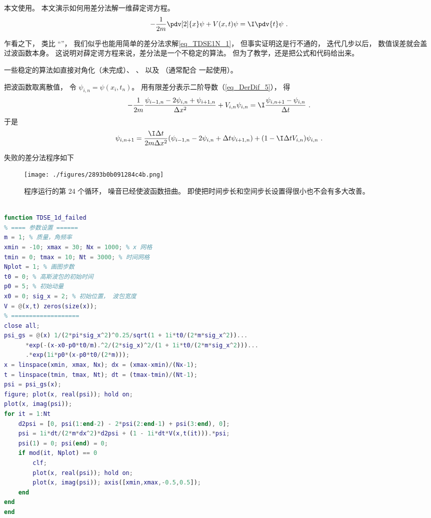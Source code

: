 

本文使用。 本文演示如何用差分法解一维薛定谔方程。
\begin{equation}\label{eq_TDSE1N_1}
-\frac{1}{2m}\pdv[2]{x}\psi + V(x,t)\psi = \I\pdv{t}\psi~.
\end{equation}

乍看之下， 类比 “”， 我们似乎也能用简单的差分法求解\autoref{eq_TDSE1N_1}， 但事实证明这是行不通的， 迭代几步以后， 数值误差就会盖过波函数本身。 这说明对薛定谔方程来说，差分法是一个不稳定的算法。 但为了教学，还是把公式和代码给出来。

一些稳定的算法如直接对角化（未完成）、 、 以及 （通常配合 一起使用）。

把波函数取离散值， 令 $\psi_{i,n} = \psi(x_i,t_n)$。 用有限差分表示二阶导数（\autoref{eq_DerDif_5}）， 得
\begin{equation}
-\frac{1}{2m}\frac{\psi_{i-1,n} - 2\psi_{i,n} + \psi_{i+1,n}}{\Delta x^2} + V_{i,n}\psi_{i,n} = \I \frac{\psi_{i, n+1} - \psi_{i, n}}{\Delta t}~.
\end{equation}
于是
\begin{equation}
\psi_{i, n+1} = \frac{\I\Delta t}{2m\Delta x^2} (\psi_{i-1,n} - 2\psi_{i,n} + \Delta t\psi_{i+1,n}) + (1-\I \Delta t V_{i,n})\psi_{i,n}~.
\end{equation}

失败的差分法程序如下
\begin{figure}[ht]
\centering
\texttt{[image: ./figures/2893b0b091284c4b.png]}
\caption{程序运行的第 24 个循环， 噪音已经使波函数扭曲。 即使把时间步长和空间步长设置得很小也不会有多大改善。} \label{fig_TDSE1N_1}
\end{figure}

\begin{lstlisting}[language=matlab, caption=TDSE\_1d\_failed.m]
% 差分法解一维薛定谔方程

function TDSE_1d_failed
% ==== 参数设置 ======
m = 1; % 质量，角频率
xmin = -10; xmax = 30; Nx = 1000; % x 网格
tmin = 0; tmax = 10; Nt = 3000; % 时间网格
Nplot = 1; % 画图步数
t0 = 0; % 高斯波包的初始时间
p0 = 5; % 初始动量
x0 = 0; sig_x = 2; % 初始位置， 波包宽度
V = @(x,t) zeros(size(x));
% ===================
close all;
psi_gs = @(x) 1/(2*pi*sig_x^2)^0.25/sqrt(1 + 1i*t0/(2*m*sig_x^2))...
      *exp(-(x-x0-p0*t0/m).^2/(2*sig_x)^2/(1 + 1i*t0/(2*m*sig_x^2)))...
      .*exp(1i*p0*(x-p0*t0/(2*m)));
x = linspace(xmin, xmax, Nx); dx = (xmax-xmin)/(Nx-1);
t = linspace(tmin, tmax, Nt); dt = (tmax-tmin)/(Nt-1);
psi = psi_gs(x);
figure; plot(x, real(psi)); hold on;
plot(x, imag(psi));
for it = 1:Nt
    d2psi = [0, psi(1:end-2) - 2*psi(2:end-1) + psi(3:end), 0];
    psi = 1i*dt/(2*m*dx^2)*d2psi + (1 - 1i*dt*V(x,t(it))).*psi;
    psi(1) = 0; psi(end) = 0;
    if mod(it, Nplot) == 0
        clf;
        plot(x, real(psi)); hold on;
        plot(x, imag(psi)); axis([xmin,xmax,-0.5,0.5]);
    end
end
end
\end{lstlisting}
